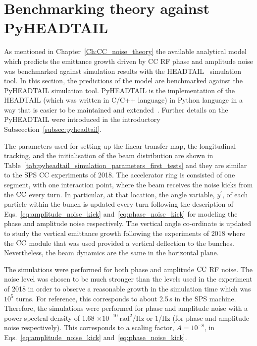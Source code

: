 \section{Benchmarking theory against PyHEADTAIL}\label{sec:benchmark_theory_with_pyheadtail}

As mentioned in Chapter~\ref{Ch:CC_noise_theory} the available analytical model which predicts the emittance growth driven by CC RF phase and amplitude noise was benchmarked against simulation results with the HEADTAIL~\cite{PhysRevSTAB.18.101001} simulation tool. In this section, the predictions of the model are benchmarked against the PyHEADTAIL simulation tool. PyHEADTAIL is the implementation of the HEADTAIL (which was written in C/C++ language) in Python language in a way that is easier to be maintained and extended~\cite{pyheadtail_schenk}. Further details on the PyHEADTAIL were introduced in the introductory Subseection~\ref{subsec:pyheadtail}.

The parameters used for setting up the linear transfer map, the longitudinal tracking, and the initialisation of the beam distribution are shown in Table~\ref{tab:pyheadtail_simulation_parameters_first_tests} and they are similar to the SPS CC experiments of 2018. The accelerator ring is consisted of one segment, with one interaction point, where the beam receives the noise kicks from the ${\mathrm{CC}}$ every turn. In particular, at that location, the angle variable, $y^\prime$, of each particle within the bunch is updated every turn following the description of Eqs.~\eqref{eq:amplitude_noise_kick} and~\eqref{eq:phase_noise_kick} for modeling the phase and amplitude noise respectively. The vertical angle co-ordinate is updated to study the vertical emittance growth following the experiments of 2018 where the ${\mathrm{CC}}$ module that was used provided a vertical deflection to the bunches. Nevertheless, the beam dynamics are the same in the horizontal plane.

The simulations were performed for both phase and amplitude ${\mathrm{CC}}$ RF noise. The noise level was chosen to be much stronger than the levels used in the experiment of 2018 in order to observe a reasonable growth in the simulation time which was $10^5$ turns. For reference, this corresponds to about 2.5\,s in the SPS machine. Therefore, the simulations were performed for phase and amplitude noise with a power spectral density of 1.68 $\times 10^{-10} \ \mathrm{rad^2/Hz}$ or 1/Hz (for phase and amplitude noise respectively). This corresponds to a scaling factor, $A=10^{-8}$, in Eqs.~\eqref{eq:amplitude_noise_kick} and~\eqref{eq:phase_noise_kick}. 

